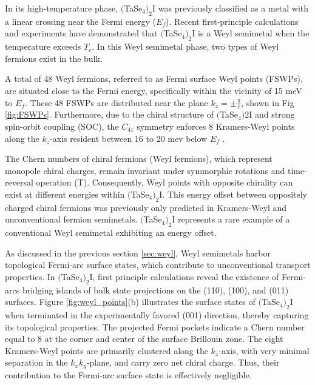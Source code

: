 In its high-temperature phase, $($TaSe$_4)_2$I was previously classified as a metal with a linear crossing near the Fermi energy ($E_f$). Recent first-principle calculations and experiments have demonstrated that $($TaSe$_4)_2$I is a Weyl semimetal when the temperature exceeds $T_c$. In this Weyl semimetal phase, two types of Weyl fermions exist in the bulk.

A total of 48 Weyl fermions, referred to as Fermi surface Weyl points (FSWPs), are situated close to the Fermi energy, specifically within the vicinity of 15 meV to $E_f$. These 48 FSWPs are distributed near the plane $k_z=\pm\frac{\pi}{c}$, shown in Fig \ref{fig:FSWPs}. Furthermore, due to the chiral structure of $($TaSe$_4)2$I and strong spin-orbit coupling (SOC), the $C_{4z}$ symmetry enforces 8 Kramers-Weyl points along the $k_z$-axis resident between 16 to 20 mev below $E_f$ \cite{chang2018topological}.

The Chern numbers of chiral fermions (Weyl fermions), which represent monopole chiral charges, remain invariant under symmorphic rotations and time-reversal operation (T). Consequently, Weyl points with opposite chirality can exist at different energies within $($TaSe$_4)_2$I. This energy offset between oppositely charged chiral fermions was previously only predicted in Kramers-Weyl and unconventional fermion semimetals. $($TaSe$_4)_2$I represents a rare example of a conventional Weyl semimetal exhibiting an energy offset.

As discussed in the previous section \ref{sec:weyl}, Weyl semimetals harbor topological Fermi-arc surface states, which contribute to unconventional transport properties. In $($TaSe$_4)_2$I, first principle calculations reveal the existence of Fermi-arcs bridging islands of bulk state projections on the (110), (100), and (011) surfaces. Figure \ref{fig:weyl_points}(b) illustrates the surface states of $($TaSe$_4)_2$I when terminated in the experimentally favored (001) direction, thereby capturing its topological properties.
The projected Fermi pockets indicate a Chern number equal to 8 at the corner and center of the surface Brillouin zone. The eight Kramers-Weyl points are primarily clustered along the $k_z$-axis, with very minimal separation in the $k_xk_y$-plane, and carry zero net chiral charge. Thus, their contribution to the Fermi-arc surface state is effectively negligible.

